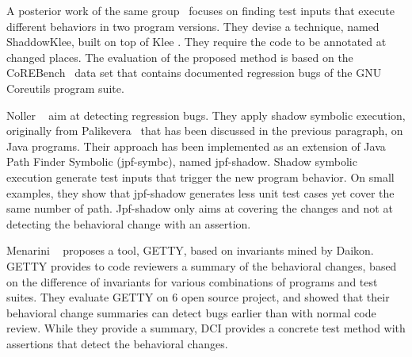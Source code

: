 A posterior work of the same group~\cite{palikareva2016shadow,Kuchta:2018:SSE:3276753.3208952} focuses on finding test inputs that execute different behaviors in two program versions. 
They devise a technique, named ShaddowKlee, built on top of Klee \cite{klee}. 
They require the code to be annotated at changed places. 
The evaluation of the proposed method is based on the CoREBench~\cite{bohme2014corebench} data set that contains documented regression bugs of the GNU Coreutils program suite. 


Noller \etal~\cite{jpfshadow} aim at detecting regression bugs. 
They apply shadow symbolic execution, originally from Palikevera~\cite{dse,palikareva2016shadow} that has been discussed in the previous paragraph, on Java programs. 
Their approach has been implemented as an extension of Java Path Finder Symbolic (jpf-symbc)\cite{jpfsymb}, named jpf-shadow. 
Shadow symbolic execution generate test inputs that trigger the new program behavior. 
On small examples, they show that jpf-shadow generates less unit test cases yet cover the same number of path. 
Jpf-shadow only aims at covering the changes and not at detecting the behavioral change with an assertion.

Menarini \etal~\cite{semantics:code:review} proposes a tool, GETTY, based on invariants mined by Daikon.
GETTY provides to code reviewers a summary of the behavioral changes, based on the difference of invariants for various combinations of programs and test suites.
They evaluate GETTY on 6 open source project, and showed that their behavioral change summaries can detect bugs earlier than with normal code review.
While they provide a summary, DCI provides a concrete test method with assertions that detect the behavioral changes. 

